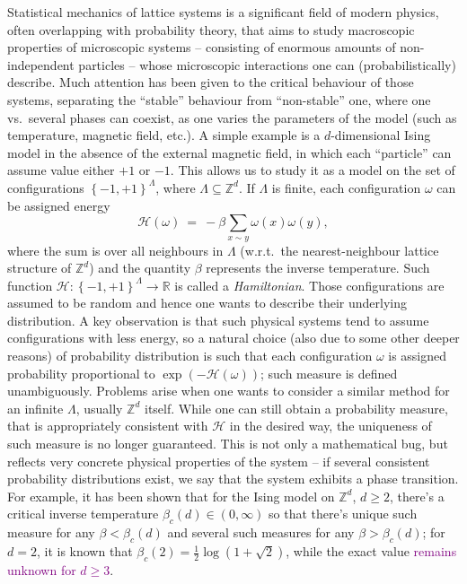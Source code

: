 \documentclass[12pt]{article}
\renewcommand{\H}{\mathcal{H}}
\newcommand{\R}{\mathbb{R}}
\newcommand{\Z}{\mathbb{Z}}
\newcommand{\set}[1]{\left\{#1\right\}}
\newcommand{\ra}{\rightarrow}
\newcommand{\1}{\mathbbm{1}}
\newcommand{\5}{\vspace{0.5cm}}
\theoremstyle{definition}
\begin{document}
Statistical mechanics of lattice systems is a significant field of modern physics, often overlapping with probability theory, that aims to study macroscopic properties of microscopic systems -- consisting of enormous amounts of non-independent particles -- whose microscopic interactions one can (probabilistically) describe. Much attention has been given to the critical behaviour of those systems, separating the ``stable'' behaviour from ``non-stable'' one, where one vs.~several phases can coexist, as one varies the parameters of the model (such as temperature, magnetic field, etc.). A simple example is a $d$-dimensional Ising model in the absence of the external magnetic field, in which each ``particle'' can assume value either $+1$ or $-1$. This allows us to study it as a model on the set of configurations $\set{-1,+1}^{\Lambda}$, where $\Lambda\subseteq\Z^d$. If $\Lambda$ is finite, each configuration $\omega$ can be assigned energy
$$\H(\omega) ~=~ -\beta\sum_{x\sim y}\omega(x)\omega(y),$$
where the sum is over all neighbours in $\Lambda$ (w.r.t.~the nearest-neighbour lattice structure of $\Z^d$) and the quantity $\beta$ represents the inverse temperature. Such function $\H:\set{-1,+1}^{\Lambda}\ra\R$ is called a \textit{Hamiltonian}. Those configurations are assumed to be random and hence one wants to describe their underlying distribution. A key observation is that such physical systems tend to assume configurations with less energy, so a natural choice (also due to some other deeper reasons) of probability distribution is such that each configuration $\omega$ is assigned probability proportional to $\exp(-\H(\omega))$; such measure is defined unambiguously. Problems arise when one wants to consider a similar method for an infinite $\Lambda$, usually $\Z^d$ itself. While one can still obtain a probability measure, that is appropriately consistent with $\H$ in the desired way, the uniqueness of such measure is no longer guaranteed. This is not only a mathematical bug, but reflects very concrete physical properties of the system -- if several consistent probability distributions exist, we say that the system exhibits a phase transition. For example, it has been shown that for the Ising model on $\Z^d$, $d\geq 2$, there's a critical inverse temperature $\beta_c(d)\in(0,\infty)$ so that there's unique such measure for any $\beta<\beta_c(d)$ and several such measures for any $\beta>\beta_c(d)$; for $d=2$, it is known that $\beta_c(2)=\frac{1}{2}\log(1+\sqrt{2})$, while the exact value \textcolor{purple}{remains unknown for $d\geq 3$}. \\
\end{document}
